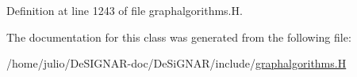 Definition at line 1243 of file graphalgorithms.\+H.



The documentation for this class was generated from the following file\+:\begin{DoxyCompactItemize}
\item 
/home/julio/\+De\+S\+I\+G\+N\+A\+R-\/doc/\+De\+Si\+G\+N\+A\+R/include/\hyperlink{graphalgorithms_8_h}{graphalgorithms.\+H}\end{DoxyCompactItemize}
